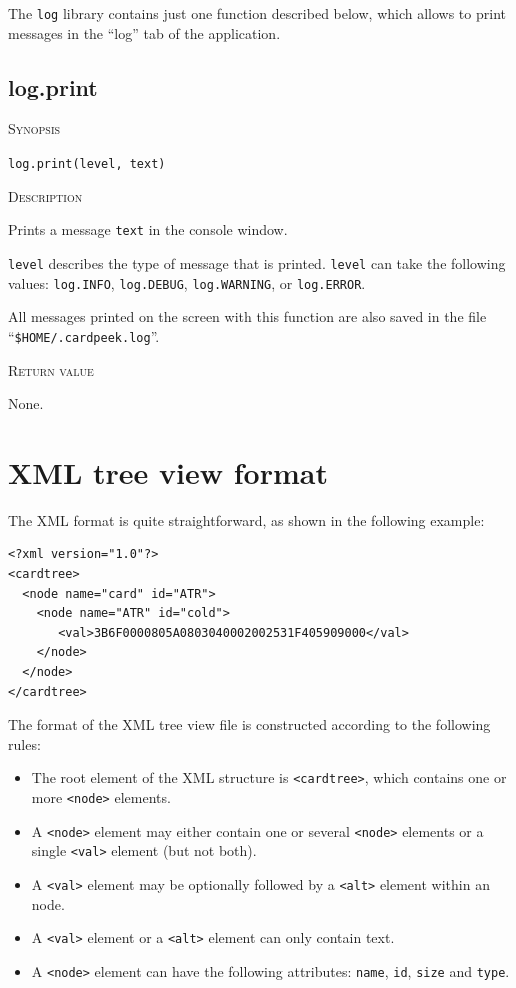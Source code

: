 \documentclass[11pt]{report}
\newcommand{\mansection}[1]{\vspace{0.5em}\par\noindent\textsc{#1}\vspace{0.5em}\par}
\newcommand{\syn}[1]{\texttt{#1}}
\begin{document}
The \syn{log} library contains just one function described below, which allows to print messages in the ``log'' tab of the application.

\subsection{log.print}

\mansection{Synopsis}
\syn{log.print(level, text)}

\mansection{Description}
  Prints a message \syn{text} in the console window.

  \syn{level} describes the type of message that is printed. 
  \syn{level} can take the following values: \syn{log.INFO}, 
  \syn{log.DEBUG}, \syn{log.WARNING}, or \syn{log.ERROR}.

  All messages printed on the screen with this function are also 
  saved in the file ``\syn{\$HOME/.cardpeek.log}''.
\mansection{Return value}
  None.


\section{XML tree view format}
\label{section:xmlformat}

The XML format is quite straightforward, as shown in the following example:
\begin{verbatim}
<?xml version="1.0"?>
<cardtree>
  <node name="card" id="ATR">
    <node name="ATR" id="cold">
       <val>3B6F0000805A0803040002002531F405909000</val>
    </node>
  </node>
</cardtree>
\end{verbatim}

\noindent
The format of the XML tree view file is constructed according to the following rules:
\begin{itemize}
\item{The root element of the XML structure is \syn{<cardtree>}, which contains one or more \syn{<node>} elements.}
\item{A \syn{<node>} element may either contain one or several \syn{<node>} elements or a single \syn{<val>} element (but not both).}
\item{A \syn{<val>} element may be optionally followed by a \syn{<alt>} element within an node.}
\item{A \syn{<val>} element or a \syn{<alt>} element can only contain text.}
\item{A \syn{<node>} element can have the following attributes: \syn{name}, \syn{id}, \syn{size} and \syn{type}.}
\end{itemize}
\end{document}
